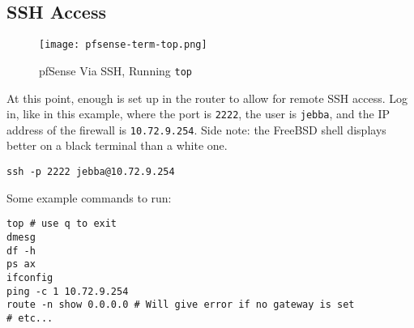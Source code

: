 \subsection{SSH Access}
\begin{figure}[h!]
\begin{center}
\texttt{[image: pfsense-term-top.png]}
 \caption{pfSense Via SSH, Running \texttt{top}}
 \label{fig:pfsense-term-top}
\end{center}
\end{figure}
At this point, enough is set up in the router to allow for remote SSH access.
Log in, like in this example, where the port is \texttt{2222}, the user is \texttt{jebba}, and the IP address of the firewall is \texttt{10.72.9.254}.
Side note: the FreeBSD shell displays better on a black terminal than a white one.

\begin{verbatim}
ssh -p 2222 jebba@10.72.9.254
\end{verbatim}

Some example commands to run:
\begin{verbatim}
top # use q to exit
dmesg
df -h
ps ax
ifconfig
ping -c 1 10.72.9.254
route -n show 0.0.0.0 # Will give error if no gateway is set
# etc...
\end{verbatim}


